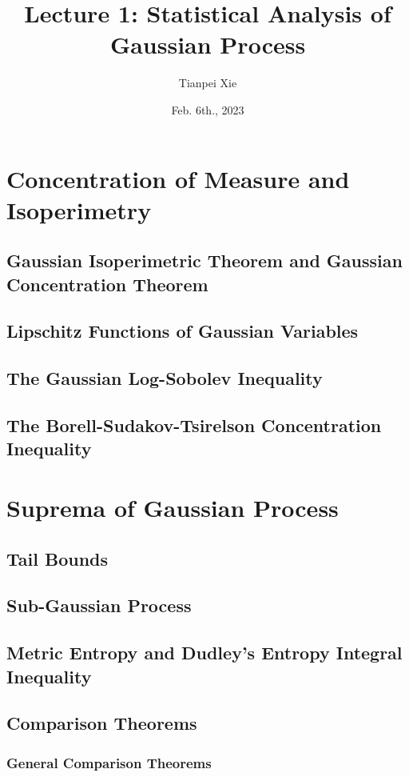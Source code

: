 \documentclass[11pt]{article}
\begin{document}
\title{Lecture 1: Statistical Analysis of Gaussian Process}
\author{ Tianpei Xie}
\date{ Feb. 6th., 2023 }
\maketitle
\tableofcontents
\newpage
\section{Concentration of Measure and Isoperimetry}
\subsection{Gaussian Isoperimetric Theorem and Gaussian Concentration Theorem}
\subsection{Lipschitz Functions of Gaussian Variables}
\subsection{The Gaussian Log-Sobolev Inequality}
\subsection{The Borell-Sudakov-Tsirelson Concentration Inequality}

\section{Suprema of Gaussian Process}
\subsection{Tail Bounds}
\subsection{Sub-Gaussian Process}
\subsection{Metric Entropy and Dudley's Entropy Integral Inequality}
\subsection{Comparison Theorems}
\subsubsection{General Comparison Theorems}
\end{document}
